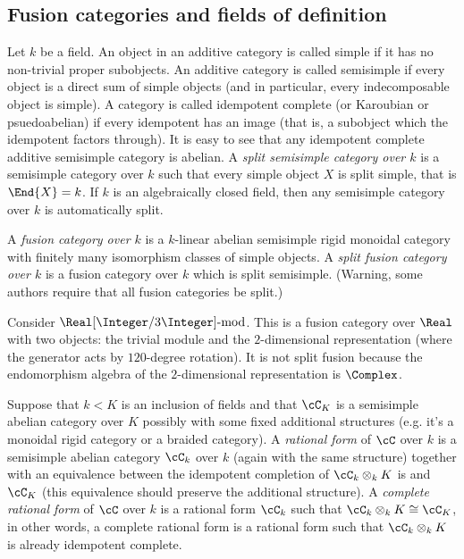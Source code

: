 
\subsection{Fusion categories and fields of definition}
Let $k$ be a field.  An object in an additive category is called simple if it has no non-trivial proper subobjects.  An additive category is called semisimple if every object is a direct sum of simple objects (and in particular, every indecomposable object is simple).  A category is called idempotent complete (or Karoubian or psuedoabelian) if every idempotent has an image (that is, a subobject which the idempotent factors through).  It is easy to see that any idempotent complete additive semisimple category is abelian.  A \emph{split semisimple category over $k$} is a semisimple category over $k$ such that every simple object $X$ is split simple, that is $\End{X} = k$.  If $k$ is an algebraically closed field, then any semisimple category over $k$ is automatically split.

A \emph{fusion category over $k$} is a $k$-linear abelian semisimple rigid monoidal category with finitely many isomorphism classes of simple objects.  A \emph{split fusion category over $k$} is a fusion category over $k$ which is split semisimple.  (Warning, some authors require that all fusion categories be split.)

\begin{example}
Consider $\Real[\Integer/3 \Integer]\text{-mod}$.   This is a fusion category  over $\Real$ with two objects: the trivial module and the $2$-dimensional representation (where the generator acts by $120$-degree rotation).  It is not split fusion because the endomorphism algebra of the $2$-dimensional representation is $\Complex$.
\end{example}

Suppose that $k<K$ is an inclusion of fields and that $\cC_K$ is a semisimple abelian category over $K$ possibly with some fixed additional structures (e.g. it's a monoidal rigid category or a braided category).  A \emph{rational form} of $\cC$ over $k$ is a semisimple abelian category $\cC_k$ over $k$ (again with the same structure) together with an equivalence between the idempotent completion of $\cC_k \otimes_k K$ is and $\cC_K$ (this equivalence should preserve the additional structure).  A \emph{complete rational form} of $\cC$ over $k$ is a rational form $\cC_k$ such that $\cC_k \otimes_k K \cong \cC_K$, in other words, a complete rational form is a rational form such that $\cC_k \otimes_k K$ is already idempotent complete.

